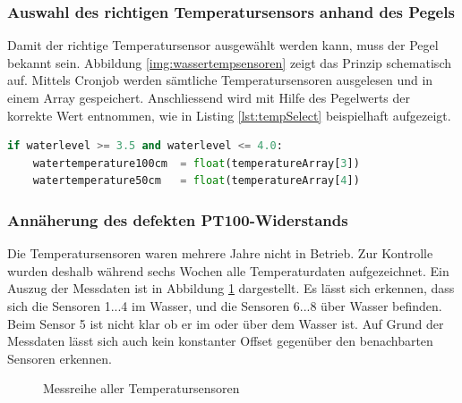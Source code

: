 \subsubsection{Auswahl des richtigen Temperatursensors anhand des Pegels}
Damit der richtige Temperatursensor ausgewählt werden kann, muss der Pegel bekannt sein. Abbildung \ref{img:wassertempsensoren} zeigt das Prinzip schematisch auf. Mittels Cronjob werden sämtliche Temperatursensoren ausgelesen und in einem Array gespeichert. Anschliessend wird mit Hilfe des Pegelwerts der korrekte Wert entnommen, wie in Listing \ref{lst:tempSelect} beispielhaft aufgezeigt.

\begin{lstlisting}[label=lst:tempSelect,caption=Auswahl des richtigen Temperatursensors, language=Python, style=py]
if waterlevel >= 3.5 and waterlevel <= 4.0:
    watertemperature100cm  = float(temperatureArray[3])
    watertemperature50cm   = float(temperatureArray[4])
\end{lstlisting}




\subsubsection{Annäherung des defekten PT100-Widerstands}
Die Temperatursensoren waren mehrere Jahre nicht in Betrieb. Zur Kontrolle wurden deshalb während sechs Wochen alle Temperaturdaten aufgezeichnet. Ein Auszug der Messdaten ist in Abbildung \ref{img:tempSensoren} dargestellt. Es lässt sich erkennen, dass sich die Sensoren 1...4 im Wasser, und die Sensoren 6...8 über Wasser befinden. Beim Sensor 5 ist nicht klar ob er im oder über dem Wasser ist. Auf Grund der Messdaten lässt sich auch kein konstanter Offset gegenüber den benachbarten Sensoren erkennen.

\begin{figure}[htbp]
	\centering
	\caption{Messreihe aller Temperatursensoren}
	\label{img:tempSensoren}
\end{figure}

